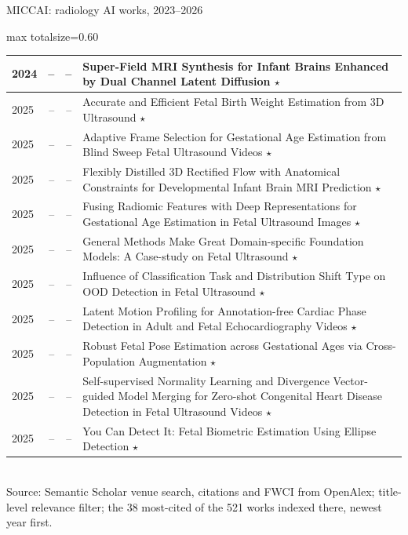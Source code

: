 \documentclass[aspectratio=169]{beamer}
\begin{document}
\begin{frame}[category=Conferences]{MICCAI: radiology AI works, 2023--2026}
\begin{adjustbox}{max totalsize={\textwidth}{0.60\textheight}}
\begin{tabular}{|l|r|r|>{\raggedright\arraybackslash}p{}|}
2024 & -- & -- & Super-Field MRI Synthesis for Infant Brains Enhanced by Dual Channel Latent Diffusion $\star$ \\ \hline
2025 & -- & -- & Accurate and Efficient Fetal Birth Weight Estimation from 3D Ultrasound $\star$ \\ \hline
2025 & -- & -- & Adaptive Frame Selection for Gestational Age Estimation from Blind Sweep Fetal Ultrasound Videos $\star$ \\ \hline
2025 & -- & -- & Flexibly Distilled 3D Rectified Flow with Anatomical Constraints for Developmental Infant Brain MRI Prediction $\star$ \\ \hline
2025 & -- & -- & Fusing Radiomic Features with Deep Representations for Gestational Age Estimation in Fetal Ultrasound Images $\star$ \\ \hline
2025 & -- & -- & General Methods Make Great Domain-specific Foundation Models: A Case-study on Fetal Ultrasound $\star$ \\ \hline
2025 & -- & -- & Influence of Classification Task and Distribution Shift Type on OOD Detection in Fetal Ultrasound $\star$ \\ \hline
2025 & -- & -- & Latent Motion Profiling for Annotation-free Cardiac Phase Detection in Adult and Fetal Echocardiography Videos $\star$ \\ \hline
2025 & -- & -- & Robust Fetal Pose Estimation across Gestational Ages via Cross-Population Augmentation $\star$ \\ \hline
2025 & -- & -- & Self-supervised Normality Learning and Divergence Vector-guided Model Merging for Zero-shot Congenital Heart Disease Detection in Fetal Ultrasound Videos $\star$ \\ \hline
2025 & -- & -- & You Can Detect It: Fetal Biometric Estimation Using Ellipse Detection $\star$ \\ \hline
\end{tabular}
\end{adjustbox}
\\[2pt]
{\tiny Source: Semantic Scholar venue search, citations and FWCI from OpenAlex; title-level relevance filter; the 38 most-cited of the 521 works indexed there, newest year first.}
\end{frame}
\end{document}
